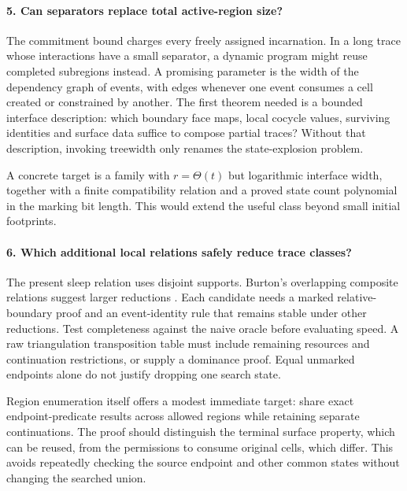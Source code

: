 \paragraph{5. Can separators replace total active-region size?}
The commitment bound charges every freely assigned incarnation. In a long
trace whose interactions have a small separator, a dynamic program might
reuse completed subregions instead. A promising parameter is the width of
the dependency graph of events, with edges whenever one event consumes a
cell created or constrained by another. The first theorem needed is a
bounded interface description: which boundary face maps, local cocycle
values, surviving identities and surface data suffice to compose partial
traces? Without that description, invoking treewidth only renames the
state-explosion problem.

A concrete target is a family with $r=\Theta(t)$ but logarithmic interface
width, together with a finite compatibility relation and a proved state
count polynomial in the marking bit length. This would extend the useful
class beyond small initial footprints.

\paragraph{6. Which additional local relations safely reduce trace classes?}
The present sleep relation uses disjoint supports. Burton's overlapping
composite relations suggest larger reductions \cite{BurtonPachner}. Each
candidate needs a marked relative-boundary proof and an event-identity rule
that remains stable under other reductions. Test completeness against the
naive oracle before evaluating speed. A raw triangulation transposition table
must include remaining resources and continuation restrictions, or supply a
dominance proof. Equal unmarked endpoints alone do not justify dropping
one search state.

Region enumeration itself offers a modest immediate target: share exact
endpoint-predicate results across allowed regions while retaining separate
continuations. The proof should distinguish the terminal surface property,
which can be reused, from the permissions to consume original cells,
which differ. This avoids repeatedly checking the source endpoint and other
common states without changing the searched union.

